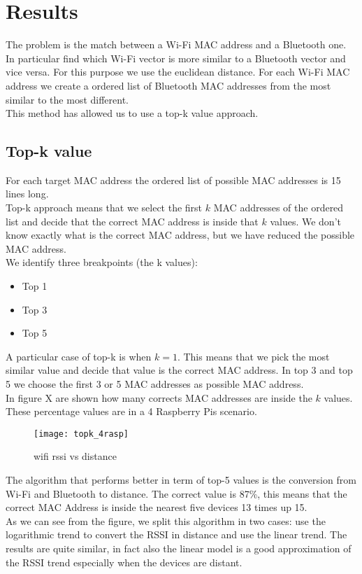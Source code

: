 \section{Results}
The problem is the match between a Wi-Fi MAC address and a Bluetooth one. In particular find which Wi-Fi vector is more similar to a Bluetooth vector and vice versa. For this purpose we use the euclidean distance. For each Wi-Fi MAC address we create a ordered list of Bluetooth MAC addresses from the most similar to the most different.\\
This method has allowed us to use a top-k value approach.

\subsection{Top-k value}
For each target MAC address the ordered list of possible MAC addresses is 15 lines long. \\
Top-k approach means that we select the first \(k\) MAC addresses of the ordered list and decide that the correct MAC address is inside that \(k\) values. We don't know exactly what is the correct MAC address, but we have reduced the possible MAC address.\\
\linebreak 
We identify three breakpoints (the k values):
\begin{itemize}
\item Top 1
\item Top 3
\item Top 5
\end{itemize}
A particular case of top-k is when \(k = 1\). This means that we pick the most similar value and decide that value is the correct MAC address.
In top 3 and top 5 we choose the first 3 or 5 MAC addresses as possible MAC address.\\
\linebreak
In figure X are shown how many corrects MAC addresses are inside the \(k\) values. These percentage values are in a 4 Raspberry Pis scenario.
\begin{figure}[H]
\centering
\texttt{[image: topk\_4rasp]}
\caption{wifi rssi vs distance}
\end{figure}
The algorithm that performs better in term of top-5 values is the conversion from Wi-Fi and Bluetooth to distance. The correct value is 87\%, this means that the correct MAC Address is inside the nearest five devices 13 times up 15.\\
As we can see from the figure, we split this algorithm in two cases: use the logarithmic trend to convert the RSSI in distance and use the linear trend. The results are quite similar, in fact also the linear model is a good approximation of the RSSI trend especially when the devices are distant.\\
